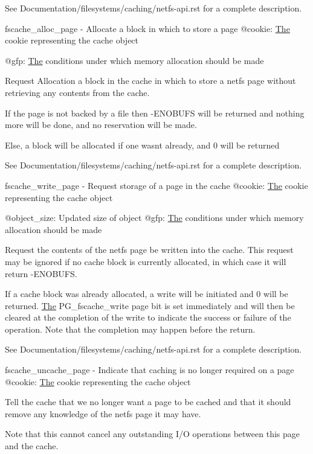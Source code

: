 See Documentation/filesystems/caching/netfs-\/api.\+rst for a complete description.

fscache\+\_\+alloc\+\_\+page -\/ Allocate a block in which to store a page @cookie\+: \mbox{\hyperlink{classThe}{The}} cookie representing the cache object

@gfp\+: \mbox{\hyperlink{classThe}{The}} conditions under which memory allocation should be made

Request Allocation a block in the cache in which to store a netfs page without retrieving any contents from the cache.

If the page is not backed by a file then -\/E\+N\+O\+B\+U\+FS will be returned and nothing more will be done, and no reservation will be made.

Else, a block will be allocated if one wasn\textquotesingle{}t already, and 0 will be returned

See Documentation/filesystems/caching/netfs-\/api.\+rst for a complete description.

fscache\+\_\+write\+\_\+page -\/ Request storage of a page in the cache @cookie\+: \mbox{\hyperlink{classThe}{The}} cookie representing the cache object

@object\+\_\+size\+: Updated size of object @gfp\+: \mbox{\hyperlink{classThe}{The}} conditions under which memory allocation should be made

Request the contents of the netfs page be written into the cache. This request may be ignored if no cache block is currently allocated, in which case it will return -\/E\+N\+O\+B\+U\+FS.

If a cache block was already allocated, a write will be initiated and 0 will be returned. \mbox{\hyperlink{classThe}{The}} P\+G\+\_\+fscache\+\_\+write page bit is set immediately and will then be cleared at the completion of the write to indicate the success or failure of the operation. Note that the completion may happen before the return.

See Documentation/filesystems/caching/netfs-\/api.\+rst for a complete description.

fscache\+\_\+uncache\+\_\+page -\/ Indicate that caching is no longer required on a page @cookie\+: \mbox{\hyperlink{classThe}{The}} cookie representing the cache object

Tell the cache that we no longer want a page to be cached and that it should remove any knowledge of the netfs page it may have.

Note that this cannot cancel any outstanding I/O operations between this page and the cache.

